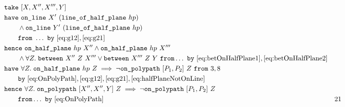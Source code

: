 \begin{boxedfigure}
\small
\begin{align*}
  &\code{take}\ [X,X'',X''',Y]\\
  &\code{have}\ \code{on\_line}\ X'\ (\code{line\_of\_half\_plane}\ hp)\\
  &\qquad\wedge \code{on\_line}\ Y'\ (\code{line\_of\_half\_plane}\ hp)\\
  &\qquad\code{from}\ \ldots\ \code{by}\ \eqref{eq:g12},\eqref{eq:g21}\\
  &\code{hence}\ \code{on\_half\_plane}\ hp\ X'' \wedge \code{on\_half\_plane}\ hp\ X'''\\
  &\qquad\wedge\forall Z.\; \between{X''}{Z}{X'''} \vee \between{X'''}{Z}{Y}\ \code{from} \ldots\ \code{by}\ \eqref{eq:betOnHalfPlane1},\eqref{eq:betOnHalfPlane2}\\
  &\code{have}\ \forall Z.\; \code{on\_half\_plane}\ hp\ Z \implies \neg\code{on\_polypath}\ [P_1,P_2]\ Z\
  \code{from}\ 3,8\\
  &\qquad\code{by}\ \eqref{eq:OnPolyPath},\eqref{eq:g12},\eqref{eq:g21},\eqref{eq:halfPlaneNotOnLine}\\
  &\code{hence}\ \forall Z.\; \code{on\_polypath}\ [X'',X'',Y]\ Z \implies \neg\code{on\_polypath}\ [P_1,P_2]\ Z\\
  &\qquad\code{from} \ldots\ \code{by}\ \eqref{eq:OnPolyPath}\ & 21\\

\end{align*}
\end{boxedfigure}
